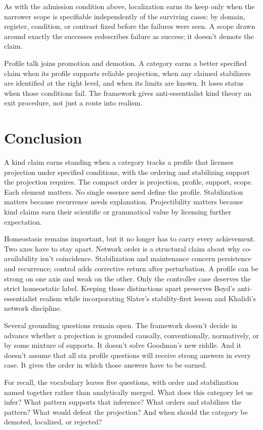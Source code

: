 \documentclass[12pt]{article}
\begin{document}
As with the admission condition above, localization earns its keep only when the
narrower scope is specifiable independently of the surviving cases: by domain,
register, condition, or contrast fixed before the failures were seen. A scope
drawn around exactly the successes redescribes failure as success; it doesn't
demote the claim.

Profile talk joins promotion and demotion. A category earns a better specified
claim when its profile supports reliable projection, when any claimed
stabilizers are identified at the right level, and when its limits are known. It
loses status when those conditions fail. The framework gives anti-essentialist
kind theory an exit procedure, not just a route into realism.

\section{Conclusion}

A kind claim earns standing when a category tracks a profile that
licenses projection under specified conditions, with the ordering and
stabilizing support the projection requires. The compact order is projection,
profile, support, scope. Each element matters. No single essence
need define the profile. Stabilization matters because recurrence needs
explanation. Projectibility matters because kind claims earn their scientific or
grammatical value by licensing further expectation.

Homeostasis remains important, but it no longer has to carry every achievement.
Two axes have to stay apart. Network order is a structural claim about why
co-availability isn't coincidence. Stabilization and maintenance concern
persistence and recurrence; control adds corrective return after perturbation. A
profile can be strong on one axis and weak on the other. Only the controller
case deserves the strict homeostatic label. Keeping those distinctions apart
preserves Boyd's anti-essentialist realism while incorporating Slater's
stability-first lesson and Khalidi's network discipline.

Several grounding questions remain open. The framework doesn't decide in
advance whether a projection is grounded causally, conventionally, normatively,
or by some mixture of supports. It doesn't solve Goodman's new riddle. And it
doesn't assume that all six profile questions will receive strong answers in
every case. It gives the order in which those answers have to be earned.

For recall, the vocabulary leaves five questions, with order and stabilization
named together rather than analytically merged. What does this category let us
infer? What pattern supports that inference? What orders and stabilizes the
pattern? What would defeat the projection? And when should the category be
demoted, localized, or rejected?
\end{document}
